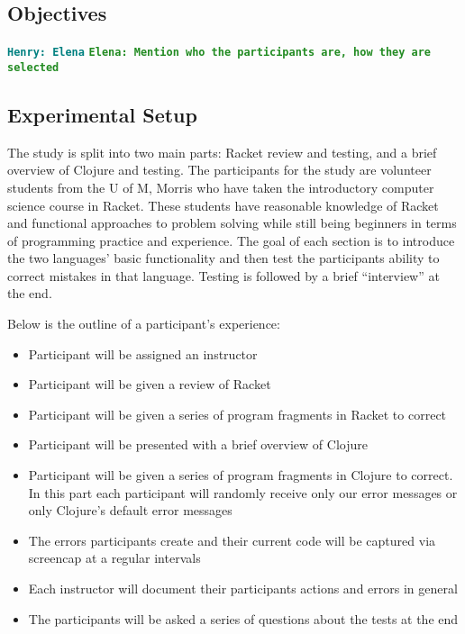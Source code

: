 \documentclass[12pt]{article}
\newcommand{\comment}[1]{{\bf \tt  {#1}}}
\newcommand{\emcomment}[1]{\textcolor{ForestGreen}{\comment{Elena: {#1}}}}
\newcommand{\hfcomment}[1]{\textcolor{Teal}{\comment{Henry: {#1}}}}
\newcommand{\thcomment}[1]{\textcolor{Coquelicot}{\comment{Thomas: {#1}}}}
\begin{document}
	\subsection{Objectives}\label{sec:obj}
	\hfcomment{Elena}
	\emcomment{Mention who the participants are, how they are selected}

	\subsection{Experimental Setup}\label{sec:setup}
	
	   
The study is split into two main parts: Racket review and testing, and a brief overview of Clojure and testing.
The participants for the study are volunteer students from the U of M, Morris who have taken the introductory computer science course in Racket.
These students have reasonable knowledge of Racket and functional approaches to problem solving while still being beginners in terms of programming practice and experience.
The goal of each section is to introduce the two languages' basic functionality and then test the participants ability to correct mistakes in that language.
 Testing is followed by a brief ``interview'' at the end. 

Below is the outline of a participant's experience:
\begin{itemize}
\item Participant will be assigned an instructor
\item Participant will be given a review of Racket
\item Participant will be given a series of program fragments in Racket to correct
\item Participant will be presented with a brief overview of Clojure
\item Participant will be given a series of  program fragments in Clojure to correct. In this part each participant will randomly receive only our error messages or only Clojure's default error messages
\item The errors participants create and their current code will be captured via screencap at a regular intervals
\item Each instructor will document their participants actions and errors in general
\item The participants will be asked a series of questions about the tests at the end
\end{itemize}
\end{document}
